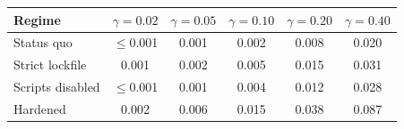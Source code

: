 \begin{tabular}{lccccc}
\toprule
Regime & $\gamma=0.02$ & $\gamma=0.05$ & $\gamma=0.10$ & $\gamma=0.20$ & $\gamma=0.40$ \\
\midrule
Status quo & $\leq$0.001 & 0.001 & 0.002 & 0.008 & 0.020 \\
Strict lockfile & 0.001 & 0.002 & 0.005 & 0.015 & 0.031 \\
Scripts disabled & $\leq$0.001 & 0.001 & 0.004 & 0.012 & 0.028 \\
Hardened & 0.002 & 0.006 & 0.015 & 0.038 & 0.087 \\
\bottomrule
\end{tabular}
